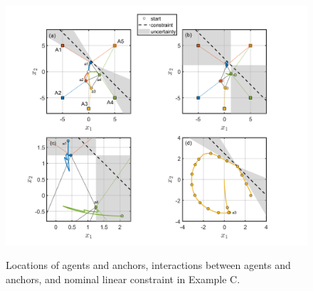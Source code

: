 \documentclass[journal,twoside,web]{ieeecolor}
\begin{document}
\begin{figure}
\begin{center}
\includegraphics[scale=0.26]{simulation_figure_finalv3.png}
\vspace{-1.5mm}
{\color{blue} \caption{Locations of agents and anchors, interactions between agents and anchors, and nominal linear constraint in Example C.}}
\label{fig_points}
\end{center}
\end{figure}
\end{document}
